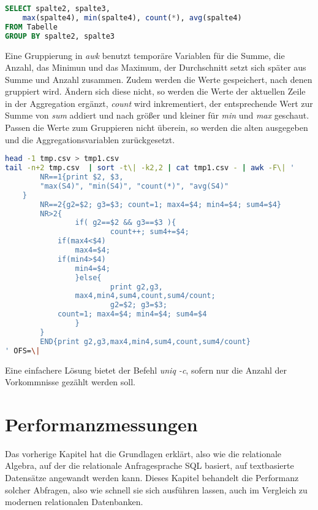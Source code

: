 \begin{lstlisting}[language=SQL]
SELECT spalte2, spalte3,
	max(spalte4), min(spalte4), count(*), avg(spalte4)
FROM Tabelle
GROUP BY spalte2, spalte3
\end{lstlisting}

Eine Gruppierung in \textit{awk} benutzt temporäre Variablen für die Summe, die Anzahl, das Minimun und das Maximum, der Durchschnitt setzt sich später aus Summe und Anzahl zusammen.
Zudem werden die Werte gespeichert, nach denen gruppiert wird. Ändern sich diese nicht, so werden die Werte der aktuellen Zeile in der Aggregation ergänzt, \textit{count} wird inkrementiert, der entsprechende Wert zur Summe von \textit{sum} addiert und nach größer und kleiner für \textit{min} und \textit{max} geschaut. Passen die Werte zum Gruppieren nicht überein, so werden die alten ausgegeben und die Aggregationsvariablen zurückgesetzt.

\begin{lstlisting}[language=Bash]
head -1 tmp.csv > tmp1.csv
tail -n+2 tmp.csv  | sort -t\| -k2,2 | cat tmp1.csv - | awk -F\| '
        NR==1{print $2, $3,
		"max(S4)", "min(S4)", "count(*)", "avg(S4)"
	}
        NR==2{g2=$2; g3=$3; count=1; max4=$4; min4=$4; sum4=$4}
        NR>2{
                if( g2==$2 && g3==$3 ){
                        count++; sum4+=$4;
			if(max4<$4)
				max4=$4;
			if(min4>$4)
				min4=$4;
                }else{
                        print g2,g3,
				max4,min4,sum4,count,sum4/count;
                        g2=$2; g3=$3;
			count=1; max4=$4; min4=$4; sum4=$4
                }
        }
        END{print g2,g3,max4,min4,sum4,count,sum4/count}
' OFS=\|
\end{lstlisting}

Eine einfachere Lösung bietet der Befehl \textit{uniq -c}, sofern nur die Anzahl der Vorkommnisse gezählt werden soll.

\section{Performanzmessungen}
Das vorherige Kapitel hat die Grundlagen erklärt, also wie die relationale Algebra, auf der die relationale Anfragesprache SQL basiert, auf textbasierte Datensätze angewandt werden kann. Dieses Kapitel behandelt die Performanz solcher Abfragen, also wie schnell sie sich ausführen lassen, auch im Vergleich zu modernen relationalen Datenbanken.

